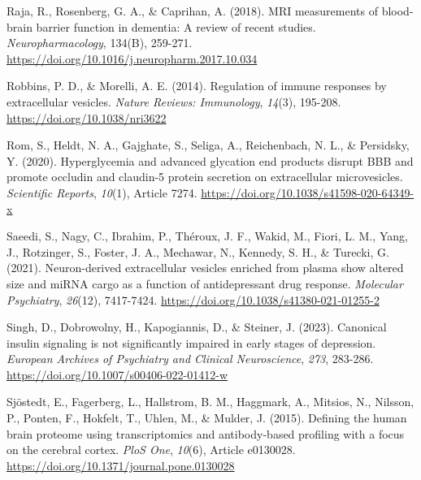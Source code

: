 \documentclass[authordate, empirical]{jote-new-article}
\begin{document}
	Raja, R., Rosenberg, G. A., \& Caprihan, A. (2018). MRI measurements of blood-brain barrier function in dementia: A review of recent studies. \emph{Neuropharmacology},\emph{ }134(B), 259-271. \href{https://doi.org/10.1016/j.neuropharm.2017.10.034}{https://doi.org/10.1016/j.neuropharm.2017.10.034}



	Robbins, P. D., \& Morelli, A. E. (2014). Regulation of immune responses by extracellular vesicles. \emph{Nature Reviews: Immunology},\emph{ 14}(3), 195-208. \href{https://doi.org/10.1038/nri3622}{https://doi.org/10.1038/nri3622}



	Rom, S., Heldt, N. A., Gajghate, S., Seliga, A., Reichenbach, N. L., \& Persidsky, Y. (2020). Hyperglycemia and advanced glycation end products disrupt BBB and promote occludin and claudin-5 protein secretion on extracellular microvesicles. \emph{Scientific Reports},\emph{ 10}(1), Article 7274. \href{https://doi.org/10.1038/s41598-020-64349-x}{https://doi.org/10.1038/s41598-020-64349-x}



	Saeedi, S., Nagy, C., Ibrahim, P., Théroux, J. F., Wakid, M., Fiori, L. M., Yang, J., Rotzinger, S., Foster, J. A., Mechawar, N., Kennedy, S. H., \& Turecki, G. (2021). Neuron-derived extracellular vesicles enriched from plasma show altered size and miRNA cargo as a function of antidepressant drug response. \emph{Molecular Psychiatry},\emph{ 26}(12), 7417-7424. \href{https://doi.org/10.1038/s41380-021-01255-2}{https://doi.org/10.1038/s41380-021-01255-2}



	Singh, D., Dobrowolny, H., Kapogiannis, D., \& Steiner, J. (2023). Canonical insulin signaling is not significantly impaired in early stages of depression. \emph{European Archives of Psychiatry and Clinical Neuroscience},\emph{ 273}, 283-286. \href{https://doi.org/10.1007/s00406-022-01412-w}{https://doi.org/10.1007/s00406-022-01412-w}



	Sjöstedt, E., Fagerberg, L., Hallstrom, B. M., Haggmark, A., Mitsios, N., Nilsson, P., Ponten, F., Hokfelt, T., Uhlen, M., \& Mulder, J. (2015). Defining the human brain proteome using transcriptomics and antibody-based profiling with a focus on the cerebral cortex. \emph{PloS One},\emph{ 10}(6), Article e0130028. \href{https://doi.org/10.1371/journal.pone.0130028}{https://doi.org/10.1371/journal.pone.0130028}
\end{document}
